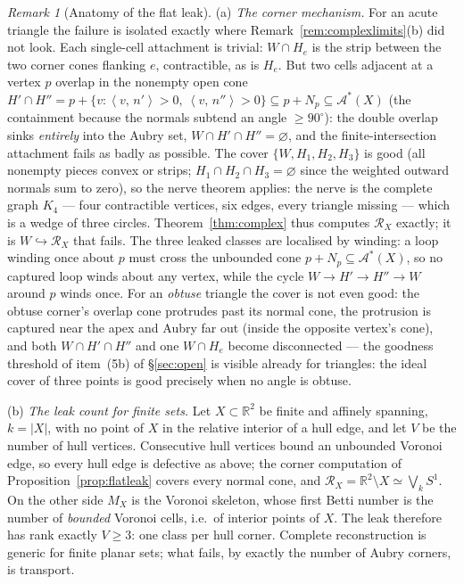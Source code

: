 \documentclass[11pt]{article}
\theoremstyle{remark}
\newtheorem{remark}[theorem]{Remark}
\newcommand{\R}{\mathbb{R}}
\newcommand{\X}{X}
\newcommand{\Mx}{M_{\X}}
\newcommand{\Rx}{\mathcal{R}_{\X}}
\newcommand{\sca}[2]{\left\langle #1,\, #2\right\rangle}
\newcommand{\Aub}{\mathcal{A}^{\ast}}
\begin{document}
\begin{remark}[Anatomy of the flat leak]\label{rem:flatleak}
(a) \emph{The corner mechanism.} For an acute triangle the failure
is isolated exactly where Remark~\ref{rem:complexlimits}(b) did not
look. Each single-cell attachment is trivial: $W\cap H_{e}$ is the
strip between the two corner cones flanking $e$, contractible, as
is $H_{e}$. But two cells adjacent at a vertex $p$ overlap in the
nonempty open cone
$H'\cap H''=p+\{v:\sca{v}{n'}>0,\ \sca{v}{n''}>0\}\subseteq
p+N_{p}\subseteq\Aub(\X)$ (the containment because the normals
subtend an angle $\ge90^{\circ}$): the double overlap sinks
\emph{entirely} into the Aubry set, $W\cap H'\cap H''=\varnothing$,
and the finite-intersection attachment fails as badly as possible.
The cover $\{W,H_{1},H_{2},H_{3}\}$ is good (all nonempty pieces
convex or strips; $H_{1}\cap H_{2}\cap H_{3}=\varnothing$ since the
weighted outward normals sum to zero), so the nerve theorem
applies: the nerve is the complete graph $K_{4}$ --- four
contractible vertices, six edges, every triangle missing --- which
is a wedge of three circles. Theorem~\ref{thm:complex} thus
computes $\Rx$ exactly; it is $W\hookrightarrow\Rx$ that fails.
The three leaked classes are localised by winding: a loop winding
once about $p$ must cross the unbounded cone
$p+N_{p}\subseteq\Aub(\X)$, so no captured loop winds about any
vertex, while the cycle $W\to H'\to H''\to W$ around $p$ winds
once. For an \emph{obtuse} triangle the cover is not even good: the
obtuse corner's overlap cone protrudes past its normal cone, the
protrusion is captured near the apex and Aubry far out (inside the
opposite vertex's cone), and both $W\cap H'\cap H''$ and one
$W\cap H_{e}$ become disconnected --- the goodness threshold of
item~(5b) of \S\ref{sec:open} is visible already for triangles:
the ideal cover of three points is good precisely when no angle is
obtuse.

(b) \emph{The leak count for finite sets.} Let $\X\subset\R^{2}$ be
finite and affinely spanning, $k=|\X|$, with no point of $\X$ in
the relative interior of a hull edge, and let $V$ be the number of
hull vertices. Consecutive hull vertices bound an unbounded Voronoi
edge, so every hull edge is defective as above; the corner
computation of Proposition~\ref{prop:flatleak} covers every normal
cone, and $\Rx=\R^{2}\setminus\X\simeq\bigvee_{k}S^{1}$. On the
other side $\Mx$ is the Voronoi skeleton, whose first Betti number
is the number of \emph{bounded} Voronoi cells, i.e.\ of interior
points of $\X$. The leak therefore has rank exactly $V\ge3$: one
class per hull corner. Complete reconstruction is generic for
finite planar sets; what fails, by exactly the number of Aubry
corners, is transport.


\end{remark}
\end{document}
